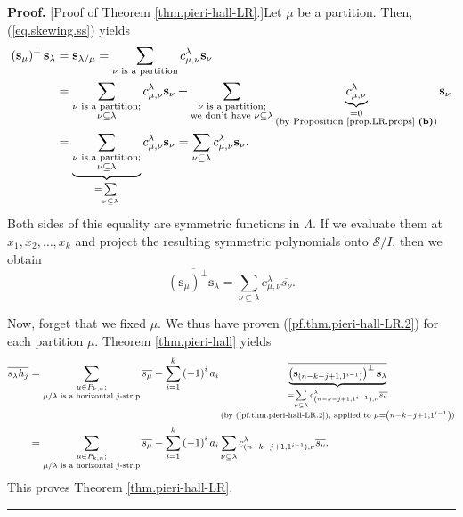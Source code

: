 \documentclass[numbers=enddot,12pt,final,onecolumn,notitlepage]{scrartcl}%
\theoremstyle{definition}
\newenvironment{proof}[1][Proof]{\noindent\textbf{#1.} }{\ \rule{0.5em}{0.5em}}
\let\sumnonlimits\sum
\renewcommand{\sum}{\sumnonlimits\limits}
\begin{document}
\begin{proof}
[Proof of Theorem \ref{thm.pieri-hall-LR}.]Let $\mu$ be a partition. Then,
(\ref{eq.skewing.ss}) yields%
\begin{align}
\left(  \mathbf{s}_{\mu}\right)  ^{\perp}\mathbf{s}_{\lambda}  &
=\mathbf{s}_{\lambda/\mu}=\sum_{\nu\text{ is a partition}}c_{\mu,\nu}%
^{\lambda}\mathbf{s}_{\nu}\nonumber\\
&  =\sum_{\substack{\nu\text{ is a partition;}\\\nu\subseteq\lambda}%
}c_{\mu,\nu}^{\lambda}\mathbf{s}_{\nu}+\sum_{\substack{\nu\text{ is a
partition;}\\\text{we don't have }\nu\subseteq\lambda}}\underbrace{c_{\mu,\nu
}^{\lambda}}_{\substack{=0\\\text{(by Proposition \ref{prop.LR.props}
\textbf{(b)})}}}\mathbf{s}_{\nu}\nonumber\\
&  =\underbrace{\sum_{\substack{\nu\text{ is a partition;}\\\nu\subseteq
\lambda}}}_{=\sum_{\nu\subseteq\lambda}}c_{\mu,\nu}^{\lambda}\mathbf{s}_{\nu
}=\sum_{\nu\subseteq\lambda}c_{\mu,\nu}^{\lambda}\mathbf{s}_{\nu}.
\label{pf.thm.pieri-hall-LR.1}%
\end{align}
Both sides of this equality are symmetric functions in $\Lambda$. If we
evaluate them at $x_{1},x_{2},\ldots,x_{k}$ and project the resulting
symmetric polynomials onto $\mathcal{S}/I$, then we obtain%
\begin{equation}
\overline{\left(  \mathbf{s}_{\mu}\right)  ^{\perp}\mathbf{s}_{\lambda}}%
=\sum_{\nu\subseteq\lambda}c_{\mu,\nu}^{\lambda}\overline{s_{\nu}}.
\label{pf.thm.pieri-hall-LR.2}%
\end{equation}


Now, forget that we fixed $\mu$. We thus have proven
(\ref{pf.thm.pieri-hall-LR.2}) for each partition $\mu$. Theorem
\ref{thm.pieri-hall} yields%
\begin{align*}
\overline{s_{\lambda}h_{j}}  &  =\sum_{\substack{\mu\in P_{k,n};\\\mu
/\lambda\text{ is a horizontal }j\text{-strip}}}\overline{s_{\mu}}-\sum
_{i=1}^{k}\left(  -1\right)  ^{i}a_{i}\underbrace{\overline{\left(
\mathbf{s}_{\left(  n-k-j+1,1^{i-1}\right)  }\right)  ^{\perp}\mathbf{s}%
_{\lambda}}}_{\substack{=\sum_{\nu\subseteq\lambda}c_{\left(  n-k-j+1,1^{i-1}%
\right)  ,\nu}^{\lambda}\overline{s_{\nu}}\\\text{(by
(\ref{pf.thm.pieri-hall-LR.2}), applied to }\mu=\left(  n-k-j+1,1^{i-1}%
\right)  \text{)}}}\\
&  =\sum_{\substack{\mu\in P_{k,n};\\\mu/\lambda\text{ is a horizontal
}j\text{-strip}}}\overline{s_{\mu}}-\sum_{i=1}^{k}\left(  -1\right)  ^{i}%
a_{i}\sum_{\nu\subseteq\lambda}c_{\left(  n-k-j+1,1^{i-1}\right)  ,\nu
}^{\lambda}\overline{s_{\nu}}.
\end{align*}
This proves Theorem \ref{thm.pieri-hall-LR}.
\end{proof}
\end{document}
